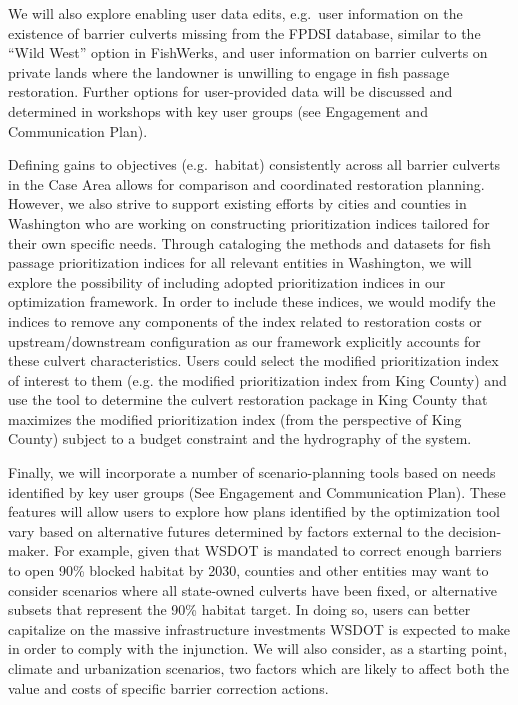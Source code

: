 We will also explore enabling user data edits, e.g.\ user information on the existence of barrier culverts missing from the FPDSI database, similar to the ``Wild West'' option in FishWerks, and user information on barrier culverts on private lands where the landowner is unwilling to engage in fish passage restoration. Further options for user-provided data will be discussed and determined in workshops with key user groups (see Engagement and Communication Plan).

Defining gains to objectives (e.g.\ habitat) consistently across all barrier culverts in the Case Area allows for comparison and coordinated restoration planning. However, we also strive to support existing efforts by cities and counties in Washington who are working on constructing prioritization indices tailored for their own specific needs. Through cataloging the methods and datasets for fish passage prioritization indices for all relevant entities in Washington, we will explore the possibility of including adopted prioritization indices in our optimization framework. In order to include these indices, we would modify the indices to remove any components of the index related to restoration costs or upstream/downstream configuration as our framework explicitly accounts for these culvert characteristics. Users could select the modified prioritization index of interest to them (e.g. the modified prioritization index from King County) and use the tool to determine the culvert restoration package in King County that maximizes the modified prioritization index (from the perspective of King County) subject to a budget constraint and the hydrography of the system.

Finally, we will incorporate a number of scenario-planning tools based on needs identified by key user groups (See Engagement and Communication Plan). These features will allow users to explore how plans identified by the optimization tool vary based on alternative futures determined by factors external to the decision-maker. For example, given that WSDOT is mandated to correct enough barriers to open 90\% blocked habitat by 2030, counties and other entities may want to consider scenarios where all state-owned culverts have been fixed, or alternative subsets that represent the 90\% habitat target. In doing so, users can better capitalize on the massive infrastructure investments WSDOT is expected to make in order to comply with the injunction. We will also consider, as a starting point, climate and urbanization scenarios, two factors which are likely to affect both the value and costs of specific barrier correction actions.
  
